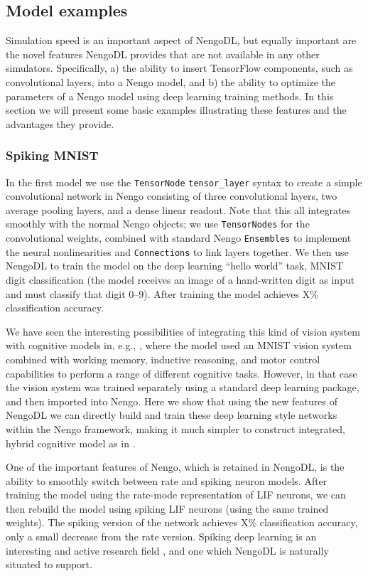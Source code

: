 \documentclass{article}
\begin{document}
\subsection{Model examples}

Simulation speed is an important aspect of NengoDL, but equally important are the novel features NengoDL provides that are not available in any other simulators.  Specifically, a) the ability to insert TensorFlow components, such as convolutional layers, into a Nengo model, and b) the ability to optimize the parameters of a Nengo model using deep learning training methods.  In this section we will present some basic examples illustrating these features and the advantages they provide.

\subsubsection{Spiking MNIST}
\label{sec:spiking_mnist}

In the first model we use the \texttt{TensorNode}  \texttt{tensor\_layer} syntax to create a simple convolutional network in Nengo consisting of three convolutional layers, two average pooling layers, and a dense linear readout.  Note that this all integrates smoothly with the normal Nengo objects; we use \texttt{TensorNodes} for the convolutional weights, combined with standard Nengo \texttt{Ensembles} to implement the neural nonlinearities and \texttt{Connections} to link layers together.  We then use NengoDL to train the model on the deep learning ``hello world'' task, MNIST digit classification (the model receives an image of a hand-written digit as input and must classify that digit 0--9).  After training the model achieves X\% classification accuracy.

We have seen the interesting possibilities of integrating this kind of vision system with cognitive models in, e.g., \citet{Eliasmith2012a}, where the model used an MNIST vision system combined with working memory, inductive reasoning, and motor control capabilities to perform a range of different cognitive tasks.  However, in that case the vision system was trained separately using a standard deep learning package, and then imported into Nengo.  Here we show that using the new features of NengoDL we can directly build and train these deep learning style networks within the Nengo framework, making it much simpler to construct integrated, hybrid cognitive model as in \citet{Eliasmith2012a}.

One of the important features of Nengo, which is retained in NengoDL, is the ability to smoothly switch between rate and spiking neuron models.  After training the model using the rate-mode representation of LIF neurons, we can then rebuild the model using spiking LIF neurons (using the same trained weights).  The spiking version of the network achieves X\% classification accuracy, only a small decrease from the rate version.  Spiking deep learning is an interesting and active research field \citep{Hunsberger2015,Lee2016}, and one which NengoDL is naturally situated to support.
\end{document}
